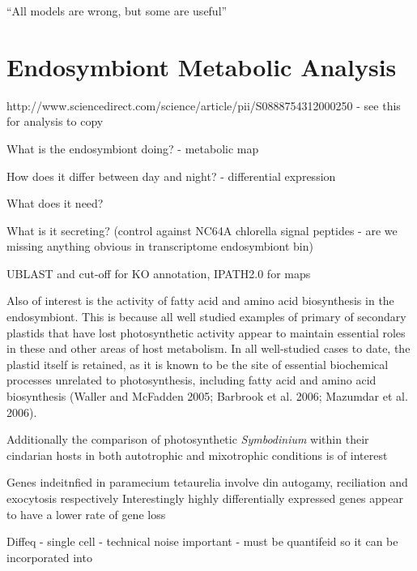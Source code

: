 \graphicspath{{chapters/6.Chapter_4/figures}}
 
\begin{savequote}[75mm]
``All models are wrong, but some are useful''
\end{savequote}



\chapter{Endosymbiont Metabolic Analysis}

http://www.sciencedirect.com/science/article/pii/S0888754312000250 - see this for analysis to copy \citep{Xie2012}

What is the endosymbiont doing? - metabolic map

How does it differ between day and night? - differential expression

What does it need?

What is it secreting? (control against NC64A chlorella signal peptides - are we missing anything obvious in transcriptome endosymbiont bin)



UBLAST and cut-off for KO annotation, IPATH2.0 for maps  \citep{Wisecaver2014}

Also of interest is the activity of fatty acid and amino acid biosynthesis in the endosymbiont.  This is because
all well studied examples of primary of secondary plastids that have lost photosynthetic activity appear to maintain 
essential roles in these and other areas of host metabolism.
In all well-studied cases to date, the plastid itself is retained, as it is known to be the site of essential biochemical processes unrelated to photosynthesis, including fatty acid and amino acid biosynthesis (Waller and McFadden 2005; Barbrook et al. 2006; Mazumdar et al. 2006). \citep{Donaher2009}

Additionally the comparison of photosynthetic \textit{Symbodinium} within their cindarian hosts in both autotrophic and mixotrophic conditions
is of interest \citep{Xiang2015}

Genes indeitnfied in paramecium tetaurelia involve din autogamy, reciliation and exocytosis respectively \citep{Arnaiz2010}
Interestingly highly differentially expressed genes appear to have a lower rate of gene loss \citep{Arnaiz2010}

Diffeq - single cell - technical noise important - must be quantifeid so it can be incorporated into 

